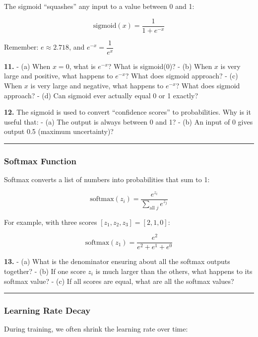 \documentclass[
  11pt,
]{article}
\begin{document}
The sigmoid ``squashes'' any input to a value between 0 and 1:

\[\text{sigmoid}(x) = \dfrac{1}{1 + e^{-x}}\]

Remember: \(e \approx 2.718\), and \(e^{-x} = \dfrac{1}{e^x}\)

\textbf{11.} - (a) When \(x = 0\), what is \(e^{-x}\)? What is
sigmoid(0)? - (b) When \(x\) is very large and positive, what happens to
\(e^{-x}\)? What does sigmoid approach? - (c) When \(x\) is very large
and negative, what happens to \(e^{-x}\)? What does sigmoid approach? -
(d) Can sigmoid ever actually equal 0 or 1 exactly?

\textbf{12.} The sigmoid is used to convert ``confidence scores'' to
probabilities. Why is it useful that: - (a) The output is always between
0 and 1? - (b) An input of 0 gives output 0.5 (maximum uncertainty)?

\begin{center}\rule{0.5\linewidth}{0.5pt}\end{center}

\hypertarget{softmax-function}{%
\subsubsection{Softmax Function}\label{softmax-function}}

Softmax converts a list of numbers into probabilities that sum to 1:

\[\text{softmax}(z_i) = \dfrac{e^{z_i}}{\sum_{\text{all } j} e^{z_j}}\]

For example, with three scores \([z_1, z_2, z_3] = [2, 1, 0]\):

\[\text{softmax}(z_1) = \dfrac{e^2}{e^2 + e^1 + e^0}\]

\textbf{13.} - (a) What is the denominator ensuring about all the
softmax outputs together? - (b) If one score \(z_i\) is much larger than
the others, what happens to its softmax value? - (c) If all scores are
equal, what are all the softmax values?

\begin{center}\rule{0.5\linewidth}{0.5pt}\end{center}

\hypertarget{learning-rate-decay}{%
\subsubsection{Learning Rate Decay}\label{learning-rate-decay}}

During training, we often shrink the learning rate over time:
\end{document}
